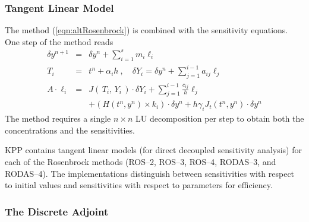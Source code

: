 \documentclass[twoside]{article}
\begin{document}
\subsubsection{Tangent Linear Model}

The method (\ref{eqn:altRosenbrock}) is combined with the sensitivity
equations. One step of the method reads
%
\begin{eqnarray}
\label{eqn:altRosenbrock-sen}
\delta y^{n+1} &=& \delta y^n + \sum_{i=1}^s m_i \ell_i\\
\nonumber
T_i &=& t^n + \alpha_i h~, %
\quad \delta Y_i = \delta y^n + \sum_{j=1}^{i-1} a_{ij} \ell_j\\
\nonumber
A \cdot \ell_i &=&
        J\left( \, T_i,\, Y_i \,\right)
              \cdot \delta Y_i
              + \sum_{j=1}^{i-1} \frac{c_{ij}}{h} \ell_j\\
\nonumber
&& +
\left( H( t^n, y^n )\times  k_i \right) \cdot \delta y^n
   + h \gamma_i J_t\left(t^n,y^n\right) \cdot \delta y^n
\end{eqnarray}
%
The method requires a single $n \times n$ LU decomposition
per step to obtain both the concentrations and the sensitivities.

KPP contains tangent linear models (for direct decoupled sensitivity
analysis) for each of the Rosenbrock methods (ROS--2, ROS--3, ROS--4,
RODAS--3, and RODAS--4). The implementations distinguish between
sensitivities with respect to initial values and sensitivities with
respect to parameters for efficiency.

\subsubsection{The Discrete Adjoint}
\end{document}
